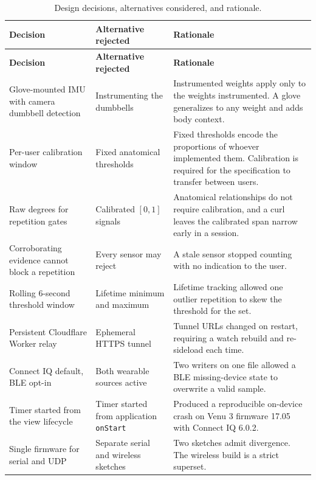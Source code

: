 \documentclass[11pt,a4paper]{article}
\newcommand{\code}[1]{\texttt{\small #1}}
\begin{document}
\begin{xltabular}{\textwidth}{@{}L{3.9cm} L{4.6cm} Y@{}}
\caption{Design decisions, alternatives considered, and rationale.}\\
\toprule
\textbf{Decision} & \textbf{Alternative rejected} & \textbf{Rationale} \\
\midrule
\endfirsthead
\toprule
\textbf{Decision} & \textbf{Alternative rejected} & \textbf{Rationale} \\
\midrule
\endhead
\bottomrule
\endfoot
Glove-mounted IMU with camera dumbbell detection &
Instrumenting the dumbbells &
Instrumented weights apply only to the weights instrumented. A glove generalizes to any weight and adds body context. \\
\addlinespace
Per-user calibration window &
Fixed anatomical thresholds &
Fixed thresholds encode the proportions of whoever implemented them. Calibration is required for the specification to transfer between users. \\
\addlinespace
Raw degrees for repetition gates &
Calibrated $[0,1]$ signals &
Anatomical relationships do not require calibration, and a curl leaves the calibrated span narrow early in a session. \\
\addlinespace
Corroborating evidence cannot block a repetition &
Every sensor may reject &
A stale sensor stopped counting with no indication to the user. \\
\addlinespace
Rolling 6-second threshold window &
Lifetime minimum and maximum &
Lifetime tracking allowed one outlier repetition to skew the threshold for the set. \\
\addlinespace
Persistent Cloudflare Worker relay &
Ephemeral HTTPS tunnel &
Tunnel URLs changed on restart, requiring a watch rebuild and re-sideload each time. \\
\addlinespace
Connect IQ default, BLE opt-in &
Both wearable sources active &
Two writers on one file allowed a BLE missing-device state to overwrite a valid sample. \\
\addlinespace
Timer started from the view lifecycle &
Timer started from application \code{onStart} &
Produced a reproducible on-device crash on Venu 3 firmware 17.05 with Connect IQ 6.0.2. \\
\addlinespace
Single firmware for serial and UDP &
Separate serial and wireless sketches &
Two sketches admit divergence. The wireless build is a strict superset. \\

\end{xltabular}
\end{document}
